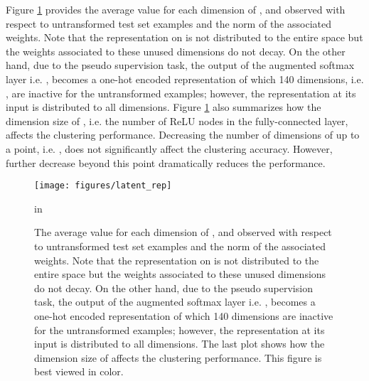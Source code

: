 \documentclass{article} \usepackage{iclr2018_conference,times}
\begin{document}
Figure \ref{fig:pseudo_latent_rep} provides the average value for each dimension of ,  and  observed with respect to untransformed test set examples and the norm of the associated weights. Note that the representation on  is not distributed to the entire space but the weights associated to these unused dimensions do not decay. On the other hand, due to the pseudo supervision task, the output of the augmented softmax layer i.e. , becomes a one-hot encoded representation of which 140 dimensions, i.e. , are inactive for the untransformed examples; however, the representation at its input is distributed to all dimensions. Figure \ref{fig:pseudo_latent_rep} also summarizes how the dimension size of , i.e. the number of ReLU nodes in the fully-connected layer, affects the clustering performance. Decreasing the number of dimensions of  up to a point, i.e. , does not significantly affect the clustering accuracy. However, further decrease beyond this point dramatically reduces the performance. 
\begin{figure}[h]
	\begin{center}
		\centerline{\texttt{[image: figures/latent\_rep]}}
		\caption{The average value for each dimension of ,  and  observed with respect to untransformed test set examples and the norm of the associated weights. Note that the representation on  is not distributed to the entire space but the weights associated to these unused dimensions do not decay. On the other hand, due to the pseudo supervision task, the output of the augmented softmax layer i.e. , becomes a one-hot encoded representation of which 140 dimensions are inactive for the untransformed examples; however, the representation at its input is distributed to all dimensions. The last plot shows how the dimension size of  affects the clustering performance. This figure is best viewed in color.}
		\label{fig:pseudo_latent_rep}
	\end{center}
	 in
\end{figure}
\end{document}
